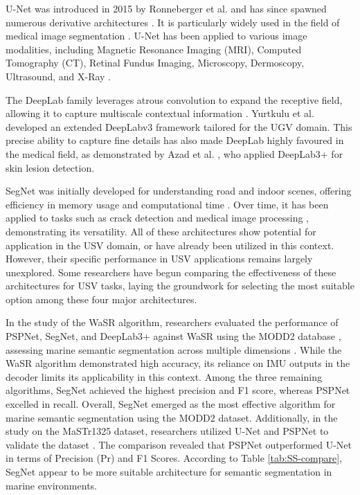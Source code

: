 U-Net was introduced in 2015 by Ronneberger et al. \cite{UNet} and has since spawned numerous derivative 
architectures \cite{h-dense-unet,3dunet,unet++}. It is particularly widely used in the field of medical 
image segmentation \cite{SSsurvey}. U-Net has been applied to various image modalities, including Magnetic 
Resonance Imaging (MRI), Computed Tomography (CT), Retinal Fundus Imaging, Microscopy, Dermoscopy, Ultrasound, 
and X-Ray \cite{unet-med-reveiw}.

The DeepLab family leverages atrous convolution to expand the receptive field, allowing it to capture 
multiscale contextual information \cite{Deeplab3+}. Yurtkulu et al. \cite{deeplabv3-ugv} developed an 
extended DeepLabv3 framework tailored for the UGV domain. This precise ability to capture fine details 
has also made DeepLab highly favoured in the medical field, as demonstrated by Azad et al. \cite{deeplabv3+-med}, 
who applied DeepLab3+ for skin lesion detection.

SegNet was initially developed for understanding road and indoor scenes, offering efficiency in memory usage and 
computational time \cite{SegNet}. Over time, it has been applied to tasks such as crack detection \cite{segnet-crack} 
and medical image processing \cite{segnet-med}, demonstrating its versatility. All of these architectures show 
potential for application in the USV domain, or have already been utilized in this context. However, their specific 
performance in USV applications remains largely unexplored. Some researchers have begun comparing the effectiveness 
of these architectures for USV tasks, laying the groundwork for selecting the most suitable option among these four 
major architectures.

In the study of the WaSR algorithm, researchers evaluated the performance of PSPNet, SegNet, and DeepLab3+ 
against WaSR using the MODD2 database \cite{MODD2}, assessing marine semantic segmentation across multiple 
dimensions \cite{WaSR}. While the WaSR algorithm demonstrated high accuracy, its reliance on IMU outputs in the 
decoder limits its applicability in this context. Among the three remaining algorithms, SegNet achieved the 
highest precision and F1 score, whereas PSPNet excelled in recall. Overall, SegNet emerged as the most effective 
algorithm for marine semantic segmentation using the MODD2 dataset. Additionally, in the study on the MaSTr1325 
dataset, researchers utilized U-Net and PSPNet to validate the dataset \cite{MaSTr1325}. The comparison revealed 
that PSPNet outperformed U-Net in terms of Precision (Pr) and F1 Scores. According to Table \ref{tab:SS-compare}, 
SegNet appear to be more suitable architecture for semantic segmentation in marine environments.

